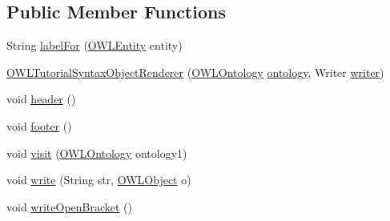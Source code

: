 \subsection*{Public Member Functions}
\begin{DoxyCompactItemize}
\item 
String \hyperlink{classuk_1_1ac_1_1manchester_1_1owl_1_1owlapi_1_1tutorialowled2011_1_1_o_w_l_tutorial_syntax_object_renderer_a501c12ea007e3fac7f86df951fe3fd53}{label\-For} (\hyperlink{interfaceorg_1_1semanticweb_1_1owlapi_1_1model_1_1_o_w_l_entity}{O\-W\-L\-Entity} entity)
\item 
\hyperlink{classuk_1_1ac_1_1manchester_1_1owl_1_1owlapi_1_1tutorialowled2011_1_1_o_w_l_tutorial_syntax_object_renderer_a419e21a0f1c607f146be87e33c7fc26e}{O\-W\-L\-Tutorial\-Syntax\-Object\-Renderer} (\hyperlink{interfaceorg_1_1semanticweb_1_1owlapi_1_1model_1_1_o_w_l_ontology}{O\-W\-L\-Ontology} \hyperlink{classuk_1_1ac_1_1manchester_1_1owl_1_1owlapi_1_1tutorialowled2011_1_1_o_w_l_tutorial_syntax_object_renderer_a8ecf6b5a156811b4fd6687fa5a99474c}{ontology}, Writer \hyperlink{classuk_1_1ac_1_1manchester_1_1owl_1_1owlapi_1_1tutorialowled2011_1_1_o_w_l_tutorial_syntax_object_renderer_af9e3c9d1111b841a7e86b2ced68ff359}{writer})
\item 
void \hyperlink{classuk_1_1ac_1_1manchester_1_1owl_1_1owlapi_1_1tutorialowled2011_1_1_o_w_l_tutorial_syntax_object_renderer_a62c813c6de9bf447a4c8535abc408015}{header} ()
\item 
void \hyperlink{classuk_1_1ac_1_1manchester_1_1owl_1_1owlapi_1_1tutorialowled2011_1_1_o_w_l_tutorial_syntax_object_renderer_a0f8e325a994558be0adaf715e49d247d}{footer} ()
\item 
void \hyperlink{classuk_1_1ac_1_1manchester_1_1owl_1_1owlapi_1_1tutorialowled2011_1_1_o_w_l_tutorial_syntax_object_renderer_a4ed4eef5283eb0e1961a60f9f2c18f4c}{visit} (\hyperlink{interfaceorg_1_1semanticweb_1_1owlapi_1_1model_1_1_o_w_l_ontology}{O\-W\-L\-Ontology} ontology1)
\item 
void \hyperlink{classuk_1_1ac_1_1manchester_1_1owl_1_1owlapi_1_1tutorialowled2011_1_1_o_w_l_tutorial_syntax_object_renderer_af418a01b32526dc53a6b01bf5cab1e40}{write} (String str, \hyperlink{interfaceorg_1_1semanticweb_1_1owlapi_1_1model_1_1_o_w_l_object}{O\-W\-L\-Object} o)
\item 
void \hyperlink{classuk_1_1ac_1_1manchester_1_1owl_1_1owlapi_1_1tutorialowled2011_1_1_o_w_l_tutorial_syntax_object_renderer_a4ecbe341a303cfbee4ae89a096ab1b32}{write\-Open\-Bracket} ()
\item 

\end{DoxyCompactItemize}

